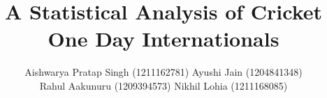 \documentclass[10pt,journal,compsoc]{IEEEtran}
\begin{document}
%
\title{A Statistical Analysis of Cricket \\ One Day Internationals}
%
%
%
%

\author{Aishwarya Pratap Singh (1211162781) Ayushi Jain (1204841348)

Rahul Aakunuru (1209394573) Nikhil Lohia (1211168085)}

% 
%
\end{document}
